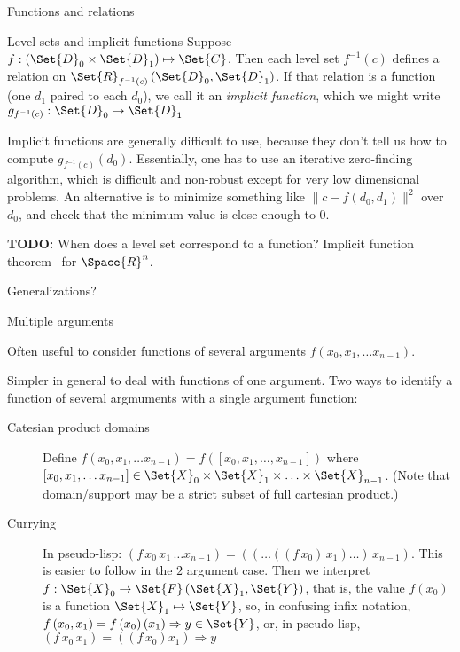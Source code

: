 \begin{plSection}{Functions and relations}
\begin{plSection}{Level sets and implicit functions}
Suppose 
$f : \left( \Set{D}_0 \times \Set{D}_1 \right) \mapsto \Set{C}$.
Then each level set $f^{-1}\left( c \right)$ defines a relation on 
$\Set{R}_{f^{-1}(c)} \left( \Set{D}_0 , \Set{D}_1 \right)$.
If that relation is a function
(one $d_1$ paired to each $d_0$),
we call it an \textit{implicit function},
which we might write $g_{f^{-1}(c)} : \Set{D}_0 \mapsto \Set{D}_1$

Implicit functions are generally difficult to use,
because they don't tell us how to compute 
$g_{f^{-1}(c)} \left( d_0 \right)$.
Essentially, one has to use an iterativc zero-finding 
algorithm, which is difficult and non-robust except
for very low dimensional problems.
An alternative is to minimize something like
$\| c - f\left( d_0, d_1 \right) \|^2$ over $d_0$,
and check that the minimum value is close enough to $0$.

\textbf{TODO:} When does a level set correspond to a function?
Implicit function theorem~\cite[Theorem~2-2]{Spivak:1965:CalculusOnManifolds}
for $\Space{R}^n$. 

Generalizations?~\cite{wiki:ImplicitFunctionTheorem,
wiki:InverseFunctionTheorem}

\end{plSection}%
\begin{plSection}{Multiple arguments}
\label{sec:Multiple-arguments}

Often useful to consider 
functions of several arguments
$f \left( x_0, x_1, \ldots x_{n-1}\right)$.

Simpler in general to deal with functions of one argument.
Two ways to identify a function of several argmuments
with a single argument function:
\begin{description}
\item[Catesian product domains]
Define $f \left( x_0, x_1, \ldots x_{n-1} \right) 
= f \left( \left[x_0, x_1, \ldots , x_{n-1} \right]\right)$
where $\left[x_0, x_1, \ldots x_{n-1} \right] \in
\Set{X}_0 \times \Set{X}_1 \times \ldots \times \Set{X}_{n-1}$. 
(Note that domain/support may be a strict subset of full cartesian 
product.)
\item[Currying]
In pseudo-lisp: $\left(f \, x_0 \, x_1 \, \ldots x_{n-1} \right) 
= 
\left(
\left(
\ldots 
\left( 
\left( 
f 
\, x_0 
\right) 
\, x_1
\right) 
\ldots 
\right) 
\, x_{n-1}
\right) 
$.
This is easier to follow in the $2$ argument case.
Then we interpret $f : \Set{X}_0 \rightarrow 
\Set{F}\left(\Set{X}_1, \Set{Y} \right)$,
that is, the value $f \left( x_0 \right)$ is a function 
$\Set{X}_1 \mapsto \Set{Y}$,
so, in confusing infix notation,
$f \left( x_0 , x_1 \right) = 
f \left( x_0 \right) \left( x_1 \right) \Rightarrow y \in \Set{Y}$,
or, in pseudo-lisp, 
$\left( f \, x_0 \, x_1 \right) = \left( \left( f \, x_0 \right) x_1 \right) \Rightarrow y$
\end{description}


\end{plSection}
\end{plSection}
